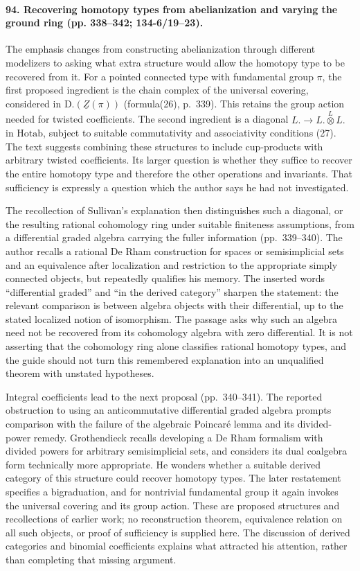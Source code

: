 \paragraph{94. Recovering homotopy types from abelianization and varying the ground ring (pp. 338--342; 134-6/19--23).}
The emphasis changes from constructing abelianization through different modelizers to asking what extra structure would allow the homotopy type to be recovered from it. For a pointed connected type with fundamental group $\pi$, the first proposed ingredient is the chain complex of the universal covering, considered in $\mathrm{D.}(\underline Z(\pi))$ (formula(26), p.~339). This retains the group action needed for twisted coefficients. The second ingredient is a diagonal $L.\to L.\overset{L}{\otimes}L.$ in $\mathrm{Hotab}$, subject to suitable commutativity and associativity conditions (27). The text suggests combining these structures to include cup-products with arbitrary twisted coefficients. Its larger question is whether they suffice to recover the entire homotopy type and therefore the other operations and invariants. That sufficiency is expressly a question which the author says he had not investigated.

The recollection of Sullivan's explanation then distinguishes such a diagonal, or the resulting rational cohomology ring under suitable finiteness assumptions, from a differential graded algebra carrying the fuller information (pp.~339--340). The author recalls a rational De Rham construction for spaces or semisimplicial sets and an equivalence after localization and restriction to the appropriate simply connected objects, but repeatedly qualifies his memory. The inserted words ``differential graded'' and ``in the derived category'' sharpen the statement: the relevant comparison is between algebra objects with their differential, up to the stated localized notion of isomorphism. The passage asks why such an algebra need not be recovered from its cohomology algebra with zero differential. It is not asserting that the cohomology ring alone classifies rational homotopy types, and the guide should not turn this remembered explanation into an unqualified theorem with unstated hypotheses.

Integral coefficients lead to the next proposal (pp.~340--341). The reported obstruction to using an anticommutative differential graded algebra prompts comparison with the failure of the algebraic Poincar\'e lemma and its divided-power remedy. Grothendieck recalls developing a De Rham formalism with divided powers for arbitrary semisimplicial sets, and considers its dual coalgebra form technically more appropriate. He wonders whether a suitable derived category of this structure could recover homotopy types. The later restatement specifies a bigraduation, and for nontrivial fundamental group it again invokes the universal covering and its group action. These are proposed structures and recollections of earlier work; no reconstruction theorem, equivalence relation on all such objects, or proof of sufficiency is supplied here. The discussion of derived categories and binomial coefficients explains what attracted his attention, rather than completing that missing argument.

